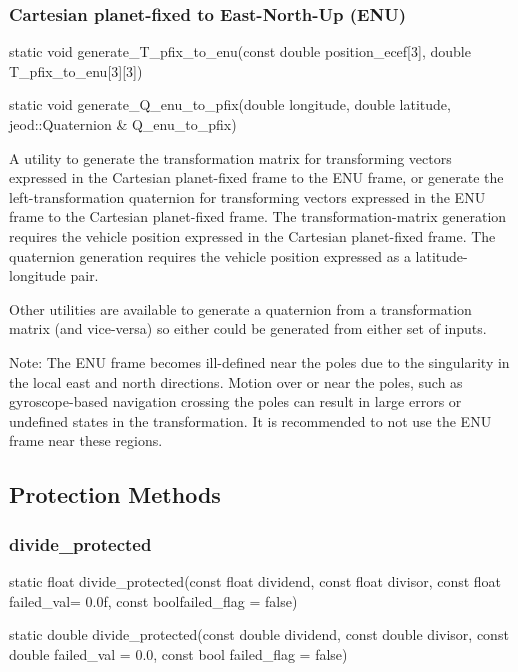 \documentclass[11pt,fleqn]{report}
\begin{document}
\subsubsection{Cartesian planet-fixed to East-North-Up (ENU)}
\begin{code}
static void generate_T_pfix_to_enu(const double position_ecef[3],
                                   double T_pfix_to_enu[3][3])

static void generate_Q_enu_to_pfix(double longitude,
                                   double latitude,
                                   jeod::Quaternion & Q_enu_to_pfix)
\end{code}

A utility to generate the transformation matrix for transforming vectors
expressed in the Cartesian planet-fixed frame to the ENU frame, or generate
the left-transformation quaternion for transforming vectors
expressed in the ENU frame to the Cartesian planet-fixed frame.
The transformation-matrix generation requires the vehicle position expressed
in the Cartesian planet-fixed frame. The quaternion generation requires the
vehicle position expressed as a latitude-longitude pair.

Other utilities are available to generate a quaternion from a transformation
matrix (and vice-versa) so either could be generated from either set of
inputs.

Note: The ENU frame becomes ill-defined near the poles due to the
singularity in the local east and north directions. Motion over or near the poles,
such as gyroscope-based navigation crossing the poles can result in large errors
or undefined states in the transformation. It is recommended to not use the ENU
frame near these regions.

\subsection{Protection Methods}

\subsubsection{divide\_protected}
\begin{code}
static float divide_protected(const float dividend,
                              const float divisor,
                              const float failed_val= 0.0f,
                              const boolfailed_flag = false)

static double divide_protected(const double dividend,
                               const double divisor,
                               const double failed_val = 0.0,
                               const bool failed_flag = false)
\end{code}
\end{document}
